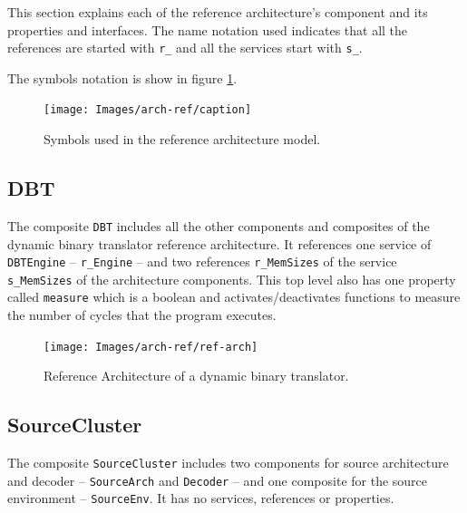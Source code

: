 \documentclass[11pt]{report}
\begin{document}
	\par This section explains each of the reference architecture's component and its properties and interfaces. The name notation used indicates that all the references are started with \texttt{r\_} and all the services start with \texttt{s\_}.
	\par The symbols notation is show in figure \ref{fig:caption}.
	
	\begin{figure} [H]
		\centering
		\texttt{[image: Images/arch-ref/caption]}
		\caption{Symbols used in the reference architecture model.}
		\label{fig:caption}
	\end{figure}

	
		\subsection{DBT}
		
		\par The composite \texttt{DBT} includes all the other components and composites of the dynamic binary translator reference architecture. It references one service of \texttt{DBTEngine} -- \texttt{r\_Engine} -- and two references \texttt{r\_MemSizes} of the service \texttt{s\_MemSizes} of the architecture components. This top level also has one property called \texttt{measure} which is a boolean and activates/deactivates functions to measure the number of cycles that the program executes.
		
		\begin{figure} [H]
			\centering
			\texttt{[image: Images/arch-ref/ref-arch]}
			\caption{Reference Architecture of a dynamic binary translator.}
			\label{fig:ref-arch}
		\end{figure}	
	
		\subsection{SourceCluster}
		
		\par The composite \texttt{SourceCluster} includes two components for source architecture and decoder -- \texttt{SourceArch} and \texttt{Decoder} -- and one composite for the source environment -- \texttt{SourceEnv}. It has no services, references or properties.
		
\end{document}
